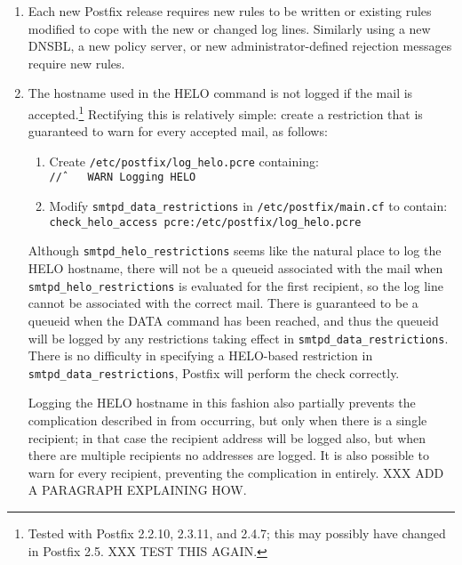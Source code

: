 \begin{enumerate}

    \item Each new Postfix release requires new rules to be written or
        existing rules modified to cope with the new or changed log lines.
        Similarly using a new \gls{DNSBL}, a new policy server, or new
        administrator-defined rejection messages require new rules.

    \item The hostname used in the HELO command is not logged if the mail
        is accepted.\footnote{Tested with Postfix 2.2.10, 2.3.11, and 2.4.7;
        this may possibly have changed in Postfix 2.5. XXX TEST THIS
        AGAIN.}  Rectifying this is relatively simple: create a restriction
        that is guaranteed to warn for every accepted mail, as follows:

        \begin{enumerate}

            \item Create \texttt{/etc/postfix/log\_helo.pcre}
                containing:\newline{}
                \tab{}\texttt{/\^/~~~~WARN~Logging~HELO}

            \item Modify \texttt{smtpd\_data\_restrictions} in
                \texttt{/etc/postfix/main.cf} to contain:\newline{}
                \tab{}\texttt{check\_helo\_access~pcre:/etc/postfix/log\_helo.pcre}

        \end{enumerate}

        Although \texttt{smtpd\_helo\_restrictions} seems like the natural
        place to log the HELO hostname, there will not be a queueid
        associated with the mail when \texttt{smtpd\_helo\_restrictions} is
        evaluated for the first recipient, so the log line cannot be
        associated with the correct mail.  There is guaranteed to be a
        queueid when the DATA command has been reached, and thus the
        queueid will be logged by any restrictions taking effect in
        \texttt{smtpd\_data\_restrictions}.  There is no difficulty in
        specifying a HELO-based restriction in
        \texttt{smtpd\_data\_restrictions}, Postfix will perform the check
        correctly.

        Logging the HELO hostname in this fashion also partially prevents
        the complication described in  from occurring, but only when there is a
        single recipient; in that case the recipient address will be logged
        also, but when there are multiple recipients no addresses are
        logged.  It is also possible to warn for every recipient,
        preventing the complication in  entirely.  XXX ADD A PARAGRAPH EXPLAINING
        HOW\@.


\end{enumerate}
